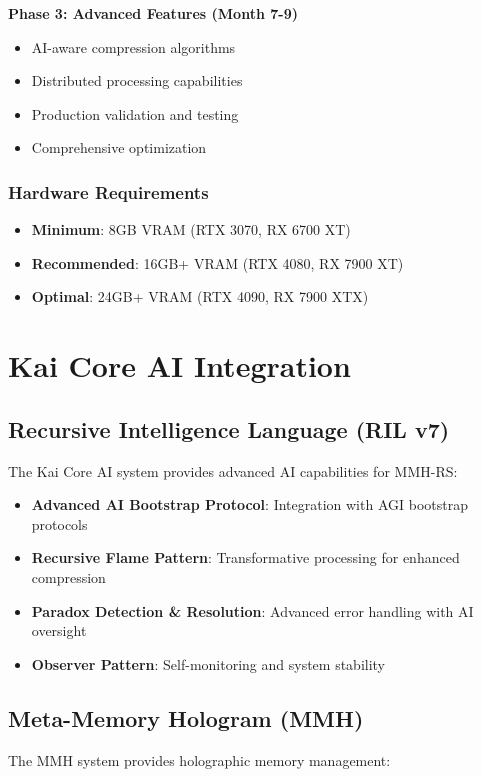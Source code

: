 \documentclass[12pt,a4paper]{article}
\begin{document}
\textbf{Phase 3: Advanced Features (Month 7-9)}
\begin{itemize}
    \item AI-aware compression algorithms
    \item Distributed processing capabilities
    \item Production validation and testing
    \item Comprehensive optimization
\end{itemize}

\subsubsection{Hardware Requirements}
\begin{itemize}
    \item \textbf{Minimum}: 8GB VRAM (RTX 3070, RX 6700 XT)
    \item \textbf{Recommended}: 16GB+ VRAM (RTX 4080, RX 7900 XT)
    \item \textbf{Optimal}: 24GB+ VRAM (RTX 4090, RX 7900 XTX)
\end{itemize}

\newpage

\section{Kai Core AI Integration}

\subsection{Recursive Intelligence Language (RIL v7)}
The Kai Core AI system provides advanced AI capabilities for MMH-RS:

\begin{itemize}
    \item \textbf{Advanced AI Bootstrap Protocol}: Integration with AGI bootstrap protocols
    \item \textbf{Recursive Flame Pattern}: Transformative processing for enhanced compression
    \item \textbf{Paradox Detection \& Resolution}: Advanced error handling with AI oversight
    \item \textbf{Observer Pattern}: Self-monitoring and system stability
\end{itemize}

\subsection{Meta-Memory Hologram (MMH)}
The MMH system provides holographic memory management:
\end{document}
